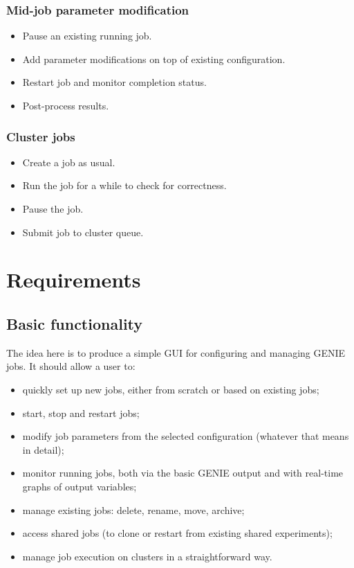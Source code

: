 \documentclass[a4paper,11pt,article]{memoir}
\begin{document}
\subsection*{Mid-job parameter modification}

\begin{itemize}
  \item{Pause an existing running job.}
  \item{Add parameter modifications on top of existing configuration.}
  \item{Restart job and monitor completion status.}
  \item{Post-process results.}
\end{itemize}

\subsection*{Cluster jobs}

\begin{itemize}
  \item{Create a job as usual.}
  \item{Run the job for a while to check for correctness.}
  \item{Pause the job.}
  \item{Submit job to cluster queue.}
\end{itemize}


\chapter{Requirements}

\section{Basic functionality}

The idea here is to produce a simple GUI for configuring and managing
GENIE jobs.  It should allow a user to:
\begin{itemize}
  \item{quickly set up new jobs, either from scratch or based on
    existing jobs;}
  \item{start, stop and restart jobs;}
  \item{modify job parameters from the selected configuration
    (whatever that means in detail);}
  \item{monitor running jobs, both via the basic GENIE output and with
    real-time graphs of output variables;}
  \item{manage existing jobs: delete, rename, move, archive;}
  \item{access shared jobs (to clone or restart from existing shared
    experiments);}
  \item{manage job execution on clusters in a straightforward way.}
\end{itemize}
\end{document}
